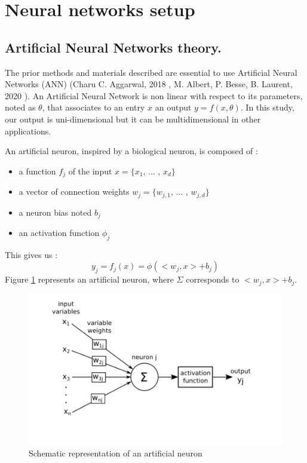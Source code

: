 \section{Neural networks setup}

\subsection{Artificial Neural Networks theory. \label{nn}}

The prior methods and materials described are essential to use Artificial Neural Networks (ANN) (Charu C. Aggarwal, 2018 \cite{livre_NN}, M. Albert, P. Besse, B. Laurent, 2020 \cite{cours_ML}). An Artificial Neural Network is non linear with respect to its parameters, noted as $\theta$, that associates to an entry $x$ an output $y = f (x, \theta)$. In this study, our output is uni-dimensional but it can be multidimensional in other applications.\newline

An artificial neuron, inspired by a biological neuron, is composed of : 
\begin{itemize}
    \item[\textbullet] a function $f_j$ of the input $x = \{x_1 \mbox{, ... , }x_d\}$
    \item[\textbullet] a vector of connection weights $w_j = \{w_{j,1} \mbox{, ... , } w_{j,d}\}$
    \item[\textbullet] a neuron bias noted $b_j$
    \item[\textbullet] an activation function $\phi_j$
\end{itemize}

This gives us : 
\begin{equation}
    y_j = f_j(x) = \phi ( <w_j , x> + b_j )
\end{equation}
Figure \ref{fig:neuron} represents an artificial neuron, where $\Sigma$ corresponds to $<w_j,x> + b_j$. 

\begin{figure}[H]
    \centering
    \includegraphics[scale = 1.1]{Graph/neuron.png}
    \caption{Schematic representation of an artificial neuron \cite{cours_ML}}
    \label{fig:neuron}
\end{figure}

